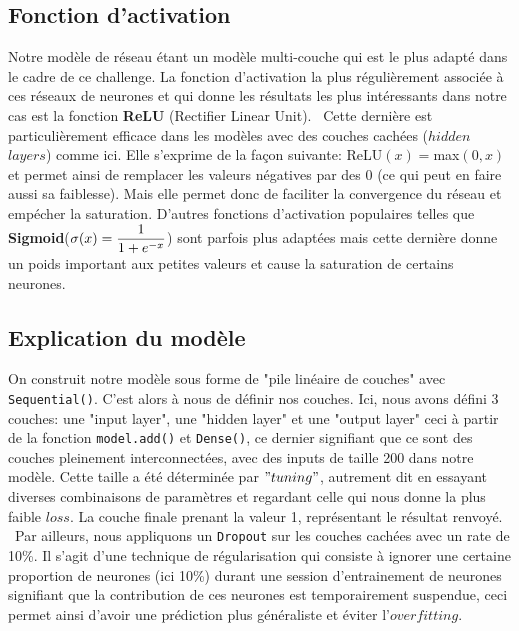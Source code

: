 \documentclass[a4paper,oneside,11pt]{article}
\newcommand{\ds}{\ensuremath{\displaystyle}}
\begin{document}
\subsection*{Fonction d'activation}
%
\qquad Notre modèle de réseau étant un modèle multi-couche qui est le plus adapté dans le cadre de ce challenge. La fonction d'activation la plus régulièrement associée à ces réseaux de neurones et qui donne les résultats les plus intéressants dans notre cas est la fonction \textbf{ReLU} (Rectifier Linear Unit). \newline
\ Cette dernière est particulièrement efficace dans les modèles avec des couches cachées ($hidden$ $layers$) comme ici. Elle s'exprime de la façon suivante: ReLU$(x)=$max$(0,x)$ et permet ainsi de remplacer les valeurs négatives par des 0 (ce qui peut en faire aussi sa faiblesse). Mais elle permet donc de faciliter la convergence du réseau et empécher la saturation.
D'autres fonctions d'activation populaires telles que \textbf{Sigmoid}($\sigma (x) = \ds{\frac{1}{1+e^{-x}}}$) sont parfois plus adaptées mais cette dernière donne un poids important aux petites valeurs et cause la saturation de certains neurones. \newline
\subsection*{Explication du modèle}
%
\qquad On construit notre modèle sous forme de "pile linéaire de couches" avec \verb+Sequential()+. C'est alors à nous de définir nos couches. Ici, nous avons défini 3 couches: une "input layer", une "hidden layer" et une "output layer" ceci à partir de la fonction \verb+model.add()+ et \verb+Dense()+, ce dernier signifiant que ce sont des couches pleinement interconnectées, avec des inputs de taille 200 dans notre modèle. Cette taille a été déterminée par $"tuning"$, autrement dit en essayant diverses combinaisons de paramètres et regardant celle qui nous donne la plus faible $loss$. La couche finale prenant la valeur 1, représentant le résultat renvoyé. \newline
\ Par ailleurs, nous appliquons un \verb+Dropout+ sur les couches cachées avec un rate de 10\%. Il s'agit d'une technique de régularisation qui consiste à ignorer une certaine proportion de neurones (ici 10\%) durant une session d'entrainement de neurones signifiant que la contribution de ces neurones est temporairement suspendue, ceci permet ainsi d'avoir une prédiction plus généraliste et éviter l'$overfitting$.
\end{document}
